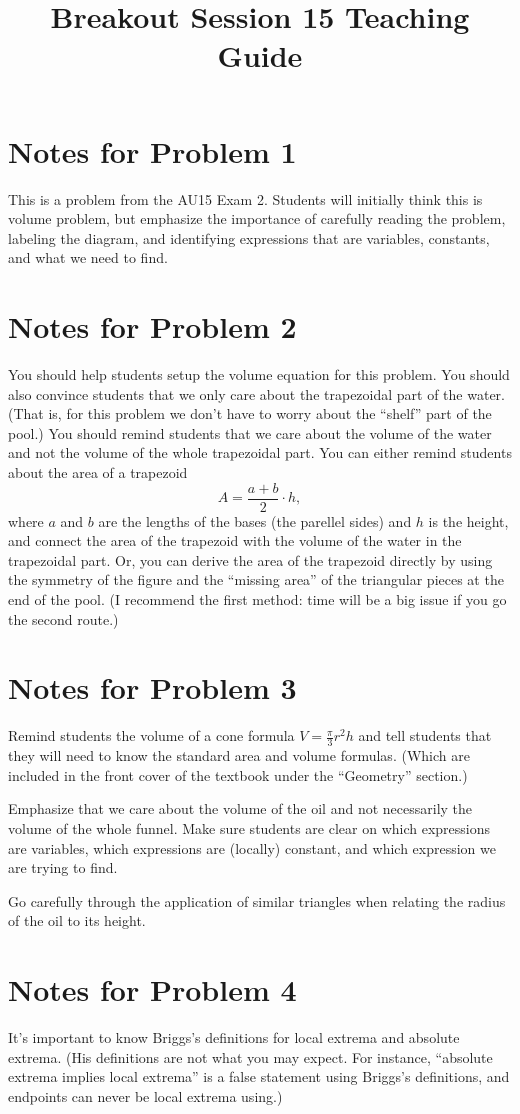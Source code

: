 \documentclass[nooutcomes]{ximera}
\title{Breakout Session 15 Teaching Guide}
\begin{document}
\begin{abstract}
\end{abstract}
\maketitle

\section{Notes for Problem 1}
This is a problem from the AU15 Exam 2.
Students will initially think this is volume problem, but emphasize the importance of carefully reading the problem, labeling the diagram, and identifying expressions that are variables, constants, and what we need to find.

\section{Notes for Problem 2}
 You should help students setup the volume equation for this problem.
 You should also convince students that we only care about the trapezoidal part of the water.
(That is, for this problem we don't have to worry about the ``shelf'' part of the pool.)
 You should remind students that we care about the volume of the water and not the volume of the whole trapezoidal part.
 You can either remind students about the area of a trapezoid
 \[
   A = \frac{a+b}{2}\cdot h,
 \]
 where $a$ and $b$ are the lengths of the bases (the parellel sides) and $h$ is the height, and connect the area of the trapezoid with the volume of the water in the trapezoidal part.
  Or, you can derive the area of the trapezoid directly by using the symmetry of the figure and the ``missing area'' of the triangular pieces at the end of the pool.
  (I recommend the first method: time will be a big issue if you go the second route.)

\section{Notes for Problem 3}
Remind students the volume of a cone formula $V = \frac{\pi}{3} r^2 h$ and tell students that they will need to know the standard area and volume formulas.
(Which are included in the front cover of the textbook under the ``Geometry'' section.)

Emphasize that we care about the volume of the oil and not necessarily the volume of the whole funnel.
Make sure students are clear on which expressions are variables, which expressions are (locally) constant, and which expression we are trying to find.

Go carefully through the application of similar triangles when relating the radius of the oil to its height.

\section{Notes for Problem 4}
It's important to know Briggs’s definitions for local extrema and absolute extrema. (His definitions are not what you may expect. For instance, ``absolute extrema implies local extrema'' is a false statement using Briggs’s definitions, and endpoints can never be local extrema using.)
\end{document}
